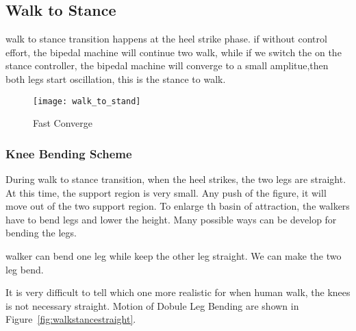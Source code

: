 \subsection{Walk to Stance}
walk to stance transition happens at the heel strike phase.
if without control effort, the bipedal machine will continue two walk, while if we switch the on the stance controller,
the bipedal machine will converge to a small amplitue,then both legs start oscillation, this is the stance to walk.

\begin{figure}[!htbp]
  \begin{center}
    \texttt{[image: walk\_to\_stand]}
    \caption{Fast Converge}
    \label{fig:walksstance}
	\end{center}
\end{figure}







\subsubsection*{Knee Bending Scheme}
During walk to stance transition, when the heel strikes, the two legs are straight. 
At this time, the support region is very small.
Any push of the figure, it will move out of the two support region.
To enlarge th basin of attraction, the walkers have to bend legs and lower the height.
Many possible ways can be develop for bending the legs.


\begin{itemize}
		walker can bend one leg while keep the other leg straight.
		We can make the two leg bend.
\end{itemize}

It is very difficult to tell which one more realistic for when human walk, the knees is not necessary straight.
Motion of Dobule Leg Bending  are shown in Figure~\ref{fig:walkstancestraight}.

